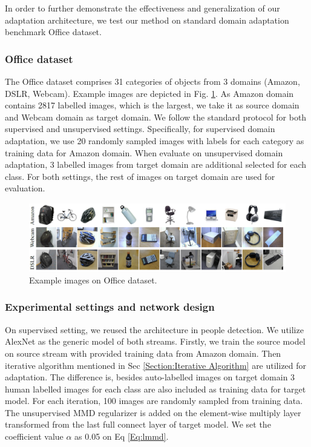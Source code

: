 \documentclass[runningheads]{llncs}
\begin{document}
In order to further demonstrate the effectiveness and generalization of our adaptation architecture, we test our method on standard domain adaptation benchmark Office dataset\cite{saenko2010adapting}.

\subsubsection{Office dataset}
The Office dataset comprises 31 categories of objects from 3 domains (Amazon, DSLR, Webcam). Example images are depicted in Fig. \ref{fig:officeimages}. As Amazon domain contains 2817 labelled images, which is the largest, we take it as source domain and Webcam domain as target domain. We follow the standard protocol for both supervised and unsupervised settings. Specifically, for supervised domain adaptation, we use 20 randomly sampled images with labels for each category as training data for Amazon domain. When evaluate on unsupervised domain adaptation, 3 labelled images from target domain are additional selected for each class. For both settings, the rest of images on target domain are used for evaluation.

\begin{figure}
\centering
\includegraphics[height=3cm]{images/officeimages.png}
\caption{Example images on Office dataset.}
\label{fig:officeimages}
\end{figure}

\subsubsection{Experimental settings and network design}
On supervised setting, we reused the architecture in people detection. We utilize AlexNet \cite{krizhevsky2012imagenet} as the generic model of both streams. Firstly, we train the source model on source stream with provided training data from Amazon domain. Then iterative algorithm mentioned in Sec \ref{Section:Iterative Algorithm} are utilized for adaptation. The difference is, besides auto-labelled images on target domain 3 human labelled images for each class are also included as training data for target model. For each iteration, 100 images are randomly sampled from training data. The unsupervised MMD regularizer is added on the element-wise multiply layer transformed from the last full connect layer of target model. We set the coefficient value $\alpha$ as 0.05 on Eq \ref{Eq:lmmd}.
\end{document}
